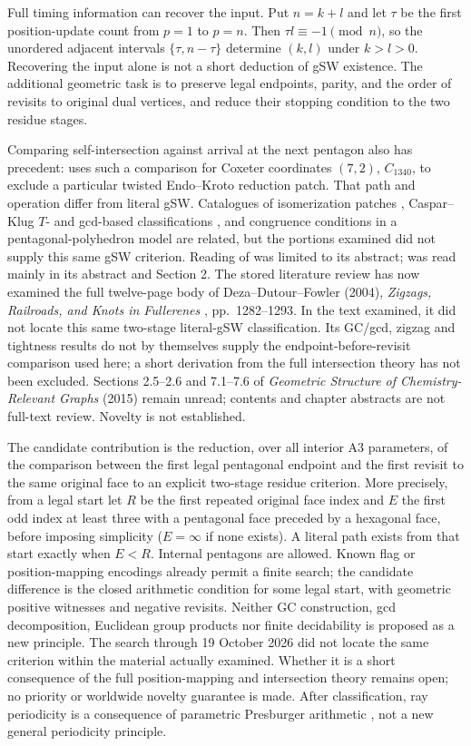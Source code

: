 \documentclass[11pt]{amsart}
\begin{document}
Full timing information can recover the input. Put $n=k+l$ and let
$\tau$ be the first position-update count from $p=1$ to $p=n$.
Then $\tau l\equiv-1\pmod n$, so the unordered adjacent intervals
$\{\tau,n-\tau\}$ determine $(k,l)$ under $k>l>0$.
Recovering the input alone is not a short deduction of gSW existence.
The additional geometric task is to preserve legal endpoints, parity,
and the order of revisits to original dual vertices, and reduce their
stopping condition to the two residue stages.

Comparing self-intersection against arrival at the next pentagon also
has precedent: \cite[Section 6, Fig.~5]{Growing} uses such a comparison
for Coxeter coordinates $(7,2)$, $C_{1340}$, to exclude a particular
twisted Endo--Kroto reduction patch. That path and operation differ from
literal gSW. Catalogues of isomerization patches \cite{Patches},
Caspar--Klug $T$- and gcd-based classifications \cite{Capsids}, and
congruence conditions in a pentagonal-polyhedron model \cite{Pentagonal}
are related, but the portions examined did not supply this same gSW
criterion. Reading of \cite{Patches} was limited to its abstract;
\cite{Pentagonal} was read mainly in its abstract and Section 2.
The stored literature review has now examined the full twelve-page
body of Deza--Dutour--Fowler (2004), \emph{Zigzags, Railroads, and
Knots in Fullerenes} \cite{Knots}, pp.~1282--1293. In the text examined,
it did not locate this same two-stage literal-gSW classification.
Its GC/gcd, zigzag and tightness results do not by themselves supply
the endpoint-before-revisit comparison used here; a short derivation
from the full intersection theory has not been excluded. Sections
2.5--2.6 and 7.1--7.6 of \emph{Geometric Structure of Chemistry-Relevant
Graphs} (2015) remain unread; contents and chapter abstracts are not
full-text review. Novelty is not established.

The candidate contribution is the reduction, over all interior A3
parameters, of the comparison between the first legal pentagonal
endpoint and the first revisit to the same original face to an explicit
two-stage residue criterion. More precisely, from a legal start let
$R$ be the first repeated original face index and $E$ the first odd
index at least three with a pentagonal face preceded by a hexagonal
face, before imposing simplicity ($E=\infty$ if none exists). A literal path exists from that
start exactly when $E<R$. Internal pentagons are allowed. Known flag
or position-mapping encodings already permit a finite search; the
candidate difference is the closed arithmetic condition for some
legal start, with geometric positive witnesses and negative revisits.
Neither GC construction, gcd decomposition, Euclidean group products
nor finite decidability is proposed as a new principle. The search
through 19 October 2026 did not locate the same criterion within the
material actually examined. Whether it is a
short consequence of the full position-mapping and intersection theory
remains open; no priority or worldwide novelty guarantee is made.
After classification, ray periodicity is a consequence of parametric
Presburger arithmetic \cite[Theorem 1.15, Property 1]{BGW}, not a new
general periodicity principle.
\end{document}
